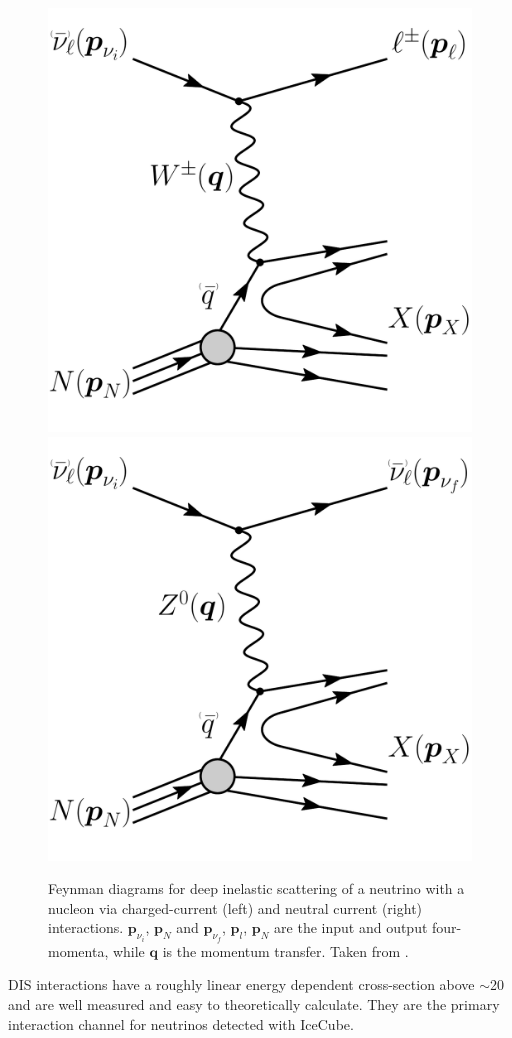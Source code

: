 \begin{figure}[h]
    \centering
    \includegraphics[width=0.4\linewidth]{figures/neutrinos_properties/feynman_DIS_CC_nu_new.pdf}
    \hspace{0.8cm}
    \includegraphics[width=0.4\linewidth]{figures/neutrinos_properties/feynman_DIS_NC_nu_new.pdf}
    \caption[Neutrino-nucleon deep inelastic scattering]{Feynman diagrams for deep inelastic scattering of a neutrino with a nucleon via charged-current (left) and neutral current (right) interactions. $\boldsymbol{p}_{\nu_i}$, $\boldsymbol{p}_{N}$ and $\boldsymbol{p}_{\nu_f}$, $\boldsymbol{p}_{l}$, $\boldsymbol{p}_{N}$ are the input and output four-momenta, while $\boldsymbol{q}$ is the momentum transfer. Taken from \cite{ATerliuk}.}
\end{figure}
DIS interactions have a roughly linear energy dependent cross-section above $\sim$\SI{20}{\gev} and are well measured and easy to theoretically calculate. They are the primary interaction channel for neutrinos detected with IceCube.

